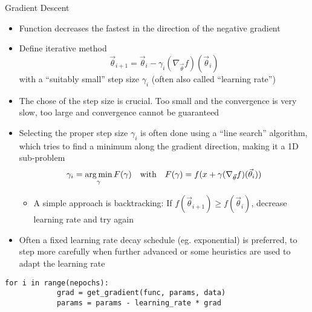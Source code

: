   \begin{frame}[fragile]{Gradient Descent}
    \begin{itemize}
      \item Function decreases the fastest in the direction of the negative gradient
      \item Define iterative method
        \begin{equation*}
          \vec{\theta}_{i+1}
          = \vec{\theta}_i - \gamma_i (\nabla_{\vec{\theta}}f)(\vec{\theta}_i)
        \end{equation*}
        with a \enquote{suitably small} step size $\gamma_i$ (often also called \enquote{learning rate})
      \item The chose of the step size is crucial. Too small and the convergence is very slow, too large and convergence cannot be guaranteed
      \item Selecting the proper step size $\gamma_i$ is often done using a \enquote{line search} algorithm, which tries to find a minimum along the gradient direction, making it a 1D sub-problem
      \begin{equation*}
        \gamma_i = \operatorname*{arg\,min}_\gamma F(\gamma) \quad\text{with}\quad
        F(\gamma) = f(x + \gamma (\nabla_{\vec{\theta}}f)(\vec{\theta}_i))
      \end{equation*}
      \begin{itemize}
        \item A simple approach is backtracking: If $f(\vec{\theta}_{i+1}) \geq f(\vec{\theta}_i)$, decrease learning rate and try again
      \end{itemize}
      \item Often a fixed learning rate decay schedule (eg. exponential) is preferred, to step more carefully when further advanced or some heuristics are used to adapt the learning rate
    \end{itemize}
    \begin{mdframed}
      \begin{lstlisting}[style=dark, gobble=6, title=\lsttitlelight{Example Implementation}]
        for i in range(nepochs):
            grad = get_gradient(func, params, data)
            params = params - learning_rate * grad
      \end{lstlisting}
    \end{mdframed}
  \end{frame}

